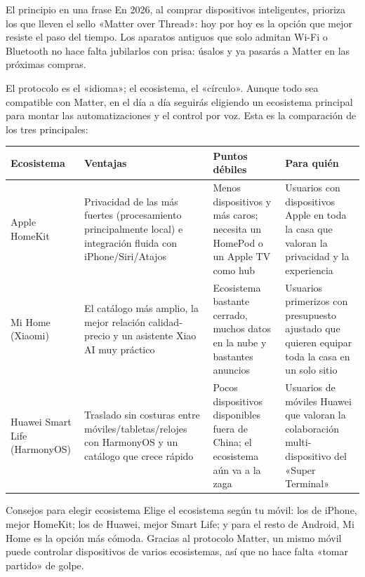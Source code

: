 \begin{tcbinfo}{El principio en una frase}
En 2026, al comprar dispositivos inteligentes, prioriza los que lleven el sello «Matter over Thread»: hoy por hoy es la opción que mejor resiste el paso del tiempo. Los aparatos antiguos que solo admitan Wi-Fi o Bluetooth no hace falta jubilarlos con prisa: úsalos y ya pasarás a Matter en las próximas compras.

\end{tcbinfo}


El protocolo es el «idioma»; el ecosistema, el «círculo». Aunque todo sea compatible con Matter, en el día a día seguirás eligiendo un ecosistema principal para montar las automatizaciones y el control por voz. Esta es la comparación de los tres principales:

\begin{center}
\begin{tabularx}{\linewidth}{|X|X|X|X|}
\hline
\textbf{Ecosistema} & \textbf{Ventajas} & \textbf{Puntos débiles} & \textbf{Para quién} \tabularnewline
\hline
Apple HomeKit & Privacidad de las más fuertes (procesamiento principalmente local) e integración fluida con iPhone/Siri/Atajos & Menos dispositivos y más caros; necesita un HomePod o un Apple TV como hub & Usuarios con dispositivos Apple en toda la casa que valoran la privacidad y la experiencia \tabularnewline
Mi Home (Xiaomi) & El catálogo más amplio, la mejor relación calidad-precio y un asistente Xiao AI muy práctico & Ecosistema bastante cerrado, muchos datos en la nube y bastantes anuncios & Usuarios primerizos con presupuesto ajustado que quieren equipar toda la casa en un solo sitio \tabularnewline
Huawei Smart Life (HarmonyOS) & Traslado sin costuras entre móviles/tabletas/relojes con HarmonyOS y un catálogo que crece rápido & Pocos dispositivos disponibles fuera de China; el ecosistema aún va a la zaga & Usuarios de móviles Huawei que valoran la colaboración multi-dispositivo del «Super Terminal» \tabularnewline
\hline
\end{tabularx}
\end{center}

\begin{tcbinfo}{Consejos para elegir ecosistema}
Elige el ecosistema según tu móvil: los de iPhone, mejor HomeKit; los de Huawei, mejor Smart Life; y para el resto de Android, Mi Home es la opción más cómoda. Gracias al protocolo Matter, un mismo móvil puede controlar dispositivos de varios ecosistemas, así que no hace falta «tomar partido» de golpe.

\end{tcbinfo}

